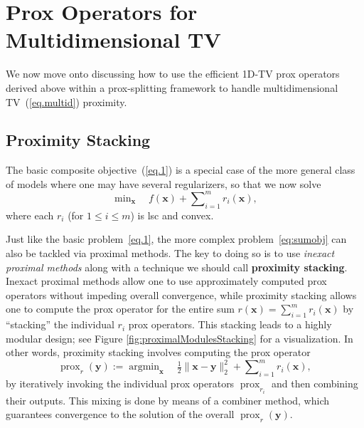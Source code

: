 \documentclass[twoside,11pt]{article}
\newcommand{\vx}{\bm{x}}       \newcommand{\vxh}{\hat{\bm{x}}}        \newcommand{\xh}{\hat{x}}    \newcommand{\vxt}{\tilde{\bm{x}}}       \newcommand{\xt}{\tilde{x}}
\newcommand{\vy}{\bm{y}}       \newcommand{\vyh}{\hat{\bm{y}}}        \newcommand{\yh}{\hat{y}}    \newcommand{\vyt}{\tilde{\bm{y}}}       \newcommand{\yt}{\tilde{y}}
\newcommand{\mynorm}[2]{\| {#1} \|_{#2}}
\newcommand{\enorm}[1]{\mynorm{#1}{2}}
\DeclareMathOperator*{\argmin}{argmin}
\DeclareMathOperator{\prox}{prox}
\newcommand{\nlsum}{\sum\nolimits}
\newcommand{\nlmin}{\min\nolimits}
\newcommand{\half}{\tfrac{1}{2}}
\numberwithin{equation}{section}
\numberwithin{theorem}{section}
\begin{document}
\section{Prox Operators for Multidimensional TV}
\label{sec:proxMulti}
We now move onto discussing how to use the efficient 1D-TV prox operators derived above within a prox-splitting framework to handle multidimensional TV~(\ref{eq.multid}) proximity.

\subsection{Proximity Stacking}
The basic composite objective~(\ref{eq.1}) is a special case of the more general class of models where one may have several regularizers, so that we now solve
\begin{equation}
  \label{eq:sumobj}
 \nlmin_{\vx} \quad f(\vx) + \nlsum_{i=1}^m r_i(\vx),
\end{equation}
where each $r_i$ (for $1\le i \le m$) is lsc and convex.

Just like the basic problem~\eqref{eq.1}, the more complex problem~\eqref{eq:sumobj} can also be tackled via proximal methods. The key to doing so is to use \emph{inexact proximal methods} along with a technique we should call \textbf{proximity stacking}. Inexact proximal methods allow one to use approximately computed prox operators without impeding overall convergence, while proximity stacking allows one to compute the prox operator for the entire sum  $r(\vx) = \sum_{i=1}^m r_i(\vx)$ by ``stacking'' the individual $r_i$ prox operators. This stacking leads to a highly modular design; see Figure \ref{fig:proximalModulesStacking} for a visualization.  In other words, proximity stacking involves computing the prox operator
\begin{equation}
  \label{eq:proxstacking}
  \prox_r(\vy) := \argmin_{\vx}\quad \half\enorm{\vx - \vy}^2 + \nlsum_{i=1}^m r_i(\vx),
\end{equation}
by iteratively invoking the individual prox operators $\prox_{r_i}$ and then combining their outputs. This mixing is done by means of a combiner method, which guarantees convergence to the solution of the overall $\prox_r(\vy)$.
\end{document}
